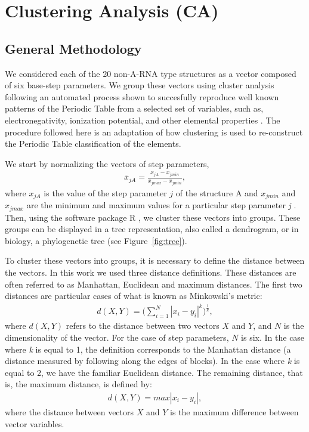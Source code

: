 \chapter{Clustering Analysis (CA)}
\label{appendix_a}

\section{General Methodology}
We considered  each of  the 20 non-A-RNA  type structures as  a vector
composed of  six base-step  parameters.  We group these  vectors using
cluster analysis  following an automated process  shown to succesfully
reproduce well  known patterns of  the Periodic Table from  a selected
set  of variables, such  as, electronegativity,  ionization potential,
and  other elemental  properties  \cite{restrepo2004}.  The  procedure
followed  here  is  an  adaptation   of  how  clustering  is  used  to
re-construct the Periodic Table classification of the elements.

We start by normalizing the vectors of step parameters,
\begin{gather}
\label{eq:normalization}  
\overline{x}_{jA}=\frac{x_{jA}-x_{jmin}}{x_{jmax}-x_{jmin}},
\end{gather}
where ${x}_{jA}$ is the value  of the step parameter $j$ of the
structure A and $x_{jmin}$ and  $x_{jmax}$ are the minimum and maximum
values for a particular step parameter \textit{j} \cite{restrepo2006}.
Then,  using  the  software  package \textsf{R}  \cite{ihaka1996},  we
cluster these vectors into groups.  These groups can be displayed in a
tree  representation,  also called  a  dendrogram,  or  in biology,  a
phylogenetic tree (see Figure~\ref{fig:tree}).

To cluster these vectors into groups, it is necessary to define the
distance between  the vectors. In  this work we used  three distance
definitions.   These distances  are  often referred  to as  Manhattan,
Euclidean  and   maximum  distances.  The  first   two  distances  are
particular cases of what is known as Minkowski's metric:
\begin{gather}
d(X,Y)= \Big( \sum_{i=1}^N |x_i-y_i|^k \Big)^\frac{1}{k},
\end{gather}
where $d(X,Y)$ refers to the distance between two vectors $X$ and $Y$,
and $N$ is  the dimensionality of the vector.  For  the case of step
parameters, $N$ is  six.  In the case where \textit{k}  is equal to 1,
the  definition  corresponds to  the  Manhattan  distance (a  distance
measured by  following along the edges  of blocks). In  the case where
\textit{k} is equal to 2, we have the familiar Euclidean distance. The
remaining distance, that is, the maximum distance, is defined by:
\begin{gather}
d(X,Y) = max |x_{i}-y_{i}|,
\end{gather}
where  the  distance  between  vectors  $X$ and  $Y$  is  the  maximum
difference between vector variables.

